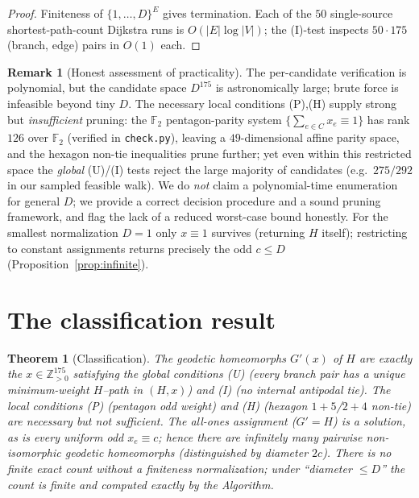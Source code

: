 \documentclass{amsart}
\newtheorem{theorem}{Theorem}
\theoremstyle{definition}
\newtheorem{remark}{Remark}
\begin{document}
\begin{proof}
Finiteness of $\{1,\dots,D\}^{E}$ gives termination. Each of the $50$
single-source shortest-path-count Dijkstra runs is $O(|E|\log|V|)$; the (I)-test
inspects $50\cdot175$ (branch, edge) pairs in $O(1)$ each.
\end{proof}

\begin{remark}[Honest assessment of practicality]\label{rem:feasible}
The per-candidate verification is polynomial, but the candidate space $D^{175}$
is astronomically large; brute force is infeasible beyond tiny $D$. The necessary
local conditions (P),(H) supply strong but \emph{insufficient} pruning: the
$\mathbb F_2$ pentagon-parity system $\{\sum_{e\in C}x_e\equiv1\}$ has rank $126$
over $\mathbb F_2$ (verified in \texttt{check.py}), leaving a $49$-dimensional
affine parity space, and the hexagon non-tie inequalities prune further; yet even
within this restricted space the \emph{global} (U)/(I) tests reject the large
majority of candidates (e.g.\ $275/292$ in our sampled feasible walk). We do
\emph{not} claim a polynomial-time enumeration for general $D$; we provide a
correct decision procedure and a sound pruning framework, and flag the lack of a
reduced worst-case bound honestly. For the smallest normalization $D=1$ only
$x\equiv1$ survives (returning $H$ itself); restricting to constant assignments
returns precisely the odd $c\le D$ (Proposition~\ref{prop:infinite}).
\end{remark}

\section{The classification result}

\begin{theorem}[Classification]\label{thm:class}
The geodetic homeomorphs $G'(x)$ of $H$ are exactly the $x\in\mathbb Z_{>0}^{175}$
satisfying the global conditions \textnormal{(U)} (every branch pair has a unique
minimum-weight $H$--path in $(H,x)$) and \textnormal{(I)} (no internal antipodal
tie). The local conditions \textnormal{(P)} (pentagon odd weight) and
\textnormal{(H)} (hexagon $1{+}5$/$2{+}4$ non-tie) are \emph{necessary but not
sufficient}. The all-ones assignment ($G'=H$) is a solution, as is every uniform
odd $x_e\equiv c$; hence there are infinitely many pairwise non-isomorphic
geodetic homeomorphs (distinguished by diameter $2c$). There is no finite exact
count without a finiteness normalization; under ``diameter $\le D$'' the count is
finite and computed exactly by the Algorithm.
\end{theorem}
\end{document}
